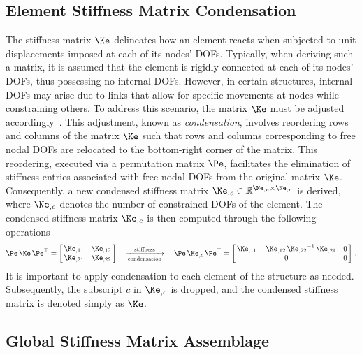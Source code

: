 \subsection{Element Stiffness Matrix Condensation}

The stiffness matrix $\Ke$ delineates how an element reacts when subjected to unit displacements imposed at each of its nodes' \acp{DOF}. Typically, when deriving such a matrix, it is assumed that the element is rigidly connected at each of its nodes' \acp{DOF}, thus possessing no internal \acp{DOF}. However, in certain structures, internal \acp{DOF} may arise due to links that allow for specific movements at nodes while constraining others. To address this scenario, the matrix $\Ke$ must be adjusted accordingly~\cite{logan2002first}. This adjustment, known as \emph{condensation}, involves reordering rows and columns of the matrix $\Ke$ such that rows and columns corresponding to free nodal \acp{DOF} are relocated to the bottom-right corner of the matrix. This reordering, executed via a permutation matrix $\Pe$, facilitates the elimination of stiffness entries associated with free nodal \acp{DOF} from the original matrix $\Ke$. Consequently, a new condensed stiffness matrix ${\Ke}_{,c} \in \mathbb{R}^{{\Ne}_{,c} \times {\Ne}_{,c}}$ is derived, where ${\Ne}_{,c}$ denotes the number of constrained \acp{DOF} of the element. The condensed stiffness matrix ${\Ke}_{,c}$ is then computed through the following operations
%
\begin{equation}
  \Pe \, \Ke \, \Pe^\top= \left[\,\begin{matrix}
    {\Ke}_{,11} & {\Ke}_{,12} \\
    {\Ke}_{,21} & {\Ke}_{,22}
  \end{matrix}\,\right] \quad \xrightarrow[\text{condensation}]{\text{stiffness}} \quad
   \Pe \, {\Ke}_{,c} \, \Pe^\top = \left[\,\begin{matrix}
    {\Ke}_{,11} - {\Ke}_{,12} \, {{\Ke}_{,22}}^{-1} \, {\Ke}_{,21} & 0 \\
    0 & 0
  \end{matrix}\,\right] \, \text{.}
\end{equation}
%
It is important to apply condensation to each element of the structure as needed. Subsequently, the subscript $c$ in ${\Ke}_{,c}$ is dropped, and the condensed stiffness matrix is denoted simply as $\Ke$.

\subsection{Global Stiffness Matrix Assemblage}

